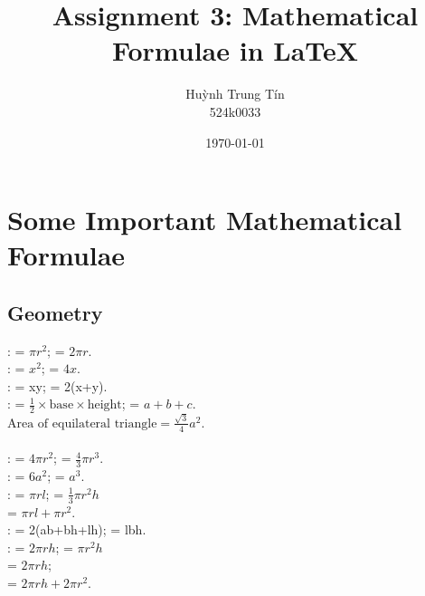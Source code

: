 \documentclass{article}
\begin{document}
\title{Assignment 3: Mathematical Formulae in LaTeX}
\author{Huỳnh Trung Tín \\ 524k0033}
\date{\today}
\maketitle

\section*{Some Important Mathematical Formulae}

\subsection*{Geometry}
 \quad :  = $\pi r^2$;  = $2 \pi r$. \\
 \quad :  = $x^2$;  = $4x$. \\
 \quad :  = xy;  = 2(x+y). \\
 \quad :  = $\frac{1}{2} \times \text{base} \times \text{height}$;  = $a+b+c$. \\
$\text{Area of equilateral triangle} = \frac{\sqrt{3}}{4} a^2.$ \\
\\
 \quad :  = $4 \pi r^2$;  = $\frac{4}{3} \pi r^3$. \\
 \quad :  = $6a^2$;  = $a^3$. \\
 \quad :  = $\pi r l$;  = $\frac{1}{3} \pi r^2 h$ \\
 = $\pi r l + \pi r^2$. \\
 \quad :  = 2(ab+bh+lh);  = lbh. \\
 \quad :  = $2 \pi r h$;  = $\pi r^2 h$ \\
 = $2 \pi r h$; \\
 = $2 \pi r h + 2 \pi r^2$.
\end{document}
